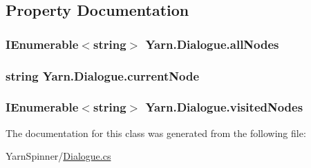 \subsection{Property Documentation}
\hypertarget{a00036_a0ee573e3d072bccf98ba1d975612d42c}{
\subsubsection[{all\-Nodes}]{\setlength{\rightskip}{0pt plus 5cm}I\-Enumerable$<$string$>$ Yarn.\-Dialogue.\-all\-Nodes\hspace{0.3cm}{\ttfamily [get]}}}\label{a00036_a0ee573e3d072bccf98ba1d975612d42c}
\hypertarget{a00036_af368b5c342d585dc6953876c5965ccc8}{
\subsubsection[{current\-Node}]{\setlength{\rightskip}{0pt plus 5cm}string Yarn.\-Dialogue.\-current\-Node\hspace{0.3cm}{\ttfamily [get]}}}\label{a00036_af368b5c342d585dc6953876c5965ccc8}
\hypertarget{a00036_ac5661051e0b7f44527fe526c7766dbbf}{
\subsubsection[{visited\-Nodes}]{\setlength{\rightskip}{0pt plus 5cm}I\-Enumerable$<$string$>$ Yarn.\-Dialogue.\-visited\-Nodes\hspace{0.3cm}{\ttfamily [get]}}}\label{a00036_ac5661051e0b7f44527fe526c7766dbbf}


The documentation for this class was generated from the following file\-:\begin{DoxyCompactItemize}
\item 
Yarn\-Spinner/\hyperlink{a00117}{Dialogue.\-cs}\end{DoxyCompactItemize}
